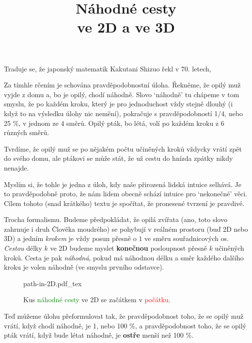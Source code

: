 \documentclass[a4paper,11pt]{article}
\title{\Huge\textsf{Náhodné cesty}\\
 \Large\textsf{ve 2D a ve 3D}
 \author{}
 \date{}
}
\theoremstyle{remark}
\begin{document}
\maketitle
\thispagestyle{fancy}

Traduje se, že japonský matematik Kakutani Shizuo řekl v 70. letech,

\begin{center}
 \emph{}
\end{center}

Za tímhle rčením je schována pravděpodobnostní úloha. Řekněme, že opilý muž
vyjde z domu a, bo je opilý, chodí náhodně. Slovo `náhodně' tu chápeme v tom
smyslu, že po každém kroku, který je pro jednoduchost vždy stejně dlouhý (i když
to na výsledku úlohy nic nemění), pokračuje s pravděpodobností 1/4, nebo 25 \%,
v jednom ze 4 směrů. Opilý pták, bo létá, volí po každém kroku z 6 různých
směrů.

Tvrdíme, že opilý muž se po nějakém počtu učiněných kroků vždycky vrátí zpět do
svého domu, ale ptákovi se může stát, že už cestu do hnízda zpátky nikdy
nenajde.

Myslím si, že tohle je jedna z úloh, kdy naše přirozená lidská intuice selhává.
Je to pravděpodobně proto, že nám lidem obecně schází intuice pro `nekonečné'
věci. Cílem tohoto (snad krátkého) textu je spočítat, že pronesené tvrzení je
pravdivé.

Trocha formalismu. Budeme předpokládat, že opilá zvířata (ano, toto slovo
zahrnuje i druh Člověka moudrého) se pohybují v reálném prostoru (buď 2D nebo
3D) a jedním \emph{krokem} je vždy posun přesně o $1$ ve směru souřadnicových
os. \emph{Cestou} délky $k$ ve 2D budeme myslet \textbf{konečnou} posloupnost
přesně $k$ učiněných kroků. Cesta je pak \emph{náhodná}, pokud má náhodnou délku
a směr každého dalšího kroku je volen náhodně (ve smyslu prvního odstavce).

\begin{figure}[t]
 \centering
 \def\svgwidth{.5\textwidth}
 {path-in-2D.pdf_tex}
 \caption{Kus \textcolor{green}{náhodné cesty} ve 2D se začátkem v
 \textcolor{red}{počátku}.}
\end{figure}

Teď můžeme úlohu přeformulovat tak, že pravděpodobnost toho, že se opilý muž
vrátí, když chodí náhodně, je 1, nebo 100 \%, a pravděpodobnost toho, že se
opilý pták vrátí, když bude létat náhodně, je \textbf{ostře} menší než 100 \%.
\end{document}
